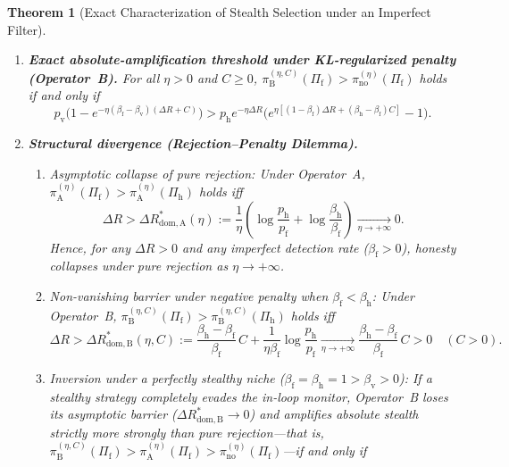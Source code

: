 \documentclass[11pt,a4paper]{article}
\newtheorem{theorem}{Theorem}
\begin{document}
\begin{theorem}[Exact Characterization of Stealth Selection under an Imperfect Filter]
\begin{enumerate}
  \item \textbf{Exact absolute-amplification threshold under KL-regularized penalty (Operator~B).} For all $\eta > 0$ and $C \ge 0$, $\pi_{\mathrm{B}}^{(\eta, C)}(\Pi_{\mathrm{f}}) > \pi_{\mathrm{no}}^{(\eta)}(\Pi_{\mathrm{f}})$ holds if and only if
  \begin{equation}\label{eq:ampB}
    p_{\mathrm{v}}\Big(1 - e^{-\eta(\beta_{\mathrm{f}} - \beta_{\mathrm{v}})(\Delta R + C)}\Big)
    > p_{\mathrm{h}} e^{-\eta \Delta R}\Big(e^{\eta[(1-\beta_{\mathrm{f}})\Delta R + (\beta_{\mathrm{h}} - \beta_{\mathrm{f}})C]} - 1\Big).
  \end{equation}

  \item \textbf{Structural divergence (Rejection--Penalty Dilemma).}
  \begin{enumerate}
    \item \emph{Asymptotic collapse of pure rejection:} Under Operator~A, $\pi_{\mathrm{A}}^{(\eta)}(\Pi_{\mathrm{f}}) > \pi_{\mathrm{A}}^{(\eta)}(\Pi_{\mathrm{h}})$ holds iff
    \begin{equation}\label{eq:domA}
      \Delta R > \Delta R_{\mathrm{dom, A}}^*(\eta)
      := \frac{1}{\eta}\left(\log\frac{p_{\mathrm{h}}}{p_{\mathrm{f}}} + \log\frac{\beta_{\mathrm{h}}}{\beta_{\mathrm{f}}}\right)
      \xrightarrow[\eta \to +\infty]{} 0.
    \end{equation}
    Hence, for any $\Delta R > 0$ and any imperfect detection rate ($\beta_{\mathrm{f}} > 0$), honesty collapses under pure rejection as $\eta \to +\infty$.
    \item \emph{Non-vanishing barrier under negative penalty when $\beta_{\mathrm{f}} < \beta_{\mathrm{h}}$:} Under Operator~B, $\pi_{\mathrm{B}}^{(\eta, C)}(\Pi_{\mathrm{f}}) > \pi_{\mathrm{B}}^{(\eta, C)}(\Pi_{\mathrm{h}})$ holds iff
    \begin{equation}\label{eq:domB}
      \Delta R > \Delta R_{\mathrm{dom, B}}^*(\eta, C)
      := \frac{\beta_{\mathrm{h}} - \beta_{\mathrm{f}}}{\beta_{\mathrm{f}}}\,C + \frac{1}{\eta \beta_{\mathrm{f}}}\log\frac{p_{\mathrm{h}}}{p_{\mathrm{f}}}
      \xrightarrow[\eta \to +\infty]{} \frac{\beta_{\mathrm{h}} - \beta_{\mathrm{f}}}{\beta_{\mathrm{f}}}\,C > 0 \quad (C > 0).
    \end{equation}
    \item \emph{Inversion under a perfectly stealthy niche ($\beta_{\mathrm{f}} = \beta_{\mathrm{h}} = 1 > \beta_{\mathrm{v}} > 0$):} If a stealthy strategy completely evades the in-loop monitor, Operator~B loses its asymptotic barrier ($\Delta R_{\mathrm{dom, B}}^* \to 0$) and amplifies absolute stealth \emph{strictly more strongly than pure rejection}---that is, $\pi_{\mathrm{B}}^{(\eta, C)}(\Pi_{\mathrm{f}}) > \pi_{\mathrm{A}}^{(\eta)}(\Pi_{\mathrm{f}}) > \pi_{\mathrm{no}}^{(\eta)}(\Pi_{\mathrm{f}})$---if and only if

\end{enumerate}
\end{enumerate}
\end{theorem}
\end{document}
